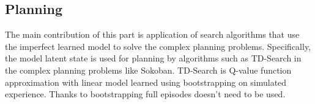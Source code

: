 \subsection{Planning}

The main contribution of this part is application of search algorithms that use the imperfect learned model to solve the complex planning problems. Specifically, the model latent state is used for planning by algorithms such as TD-Search in the complex planning problems like Sokoban. TD-Search is Q-value function approximation with linear model learned using bootstrapping on simulated experience. Thanks to bootstrapping full episodes doesn’t need to be used.
